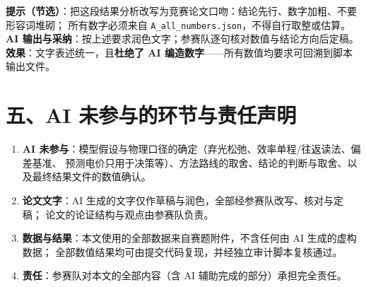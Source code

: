 \documentclass[11pt,a4paper,fontset=fandol]{ctexart}
\begin{document}
\begin{promptbox}
\textbf{提示（节选）}：把这段结果分析改写为竞赛论文口吻：结论先行、数字加粗、不要形容词堆砌；
所有数字必须来自 \texttt{A\_all\_numbers.json}，不得自行取整或估算。\\[3pt]
\textbf{AI 输出与采纳}：按上述要求润色文字；参赛队逐句核对数值与结论方向后定稿。\\[3pt]
\textbf{效果}：文字表述统一，且\textbf{杜绝了 AI 编造数字}——所有数值均要求可回溯到脚本输出文件。
\end{promptbox}

\section*{五、AI 未参与的环节与责任声明}

\begin{enumerate}[label=(\arabic*), leftmargin=2.4em]
  \item \textbf{AI 未参与}：模型假设与物理口径的确定（弃光松弛、效率单程/往返读法、偏差基准、
        预测电价只用于决策等）、方法路线的取舍、结论的判断与取舍、以及最终结果文件的数值确认。
  \item \textbf{论文文字}：AI 生成的文字仅作草稿与润色，全部经参赛队改写、核对与定稿；
        论文的论证结构与观点由参赛队负责。
  \item \textbf{数据与结果}：本文使用的全部数据来自赛题附件，不含任何由 AI 生成的虚构数据；
        全部数值结果均可由提交代码复现，并经独立审计脚本复核通过。
  \item \textbf{责任}：参赛队对本文的全部内容（含 AI 辅助完成的部分）承担完全责任。
\end{enumerate}
\end{document}
